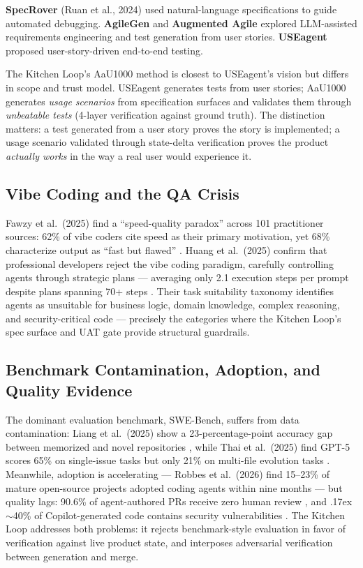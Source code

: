 \documentclass[11pt,a4paper]{article}
\newcommand{\roughly}{{\textraisebox{.17ex}{$\scriptstyle\sim$}}}
\newcommand{\textraisebox}[2]{\leavevmode\raise#1\hbox{#2}}
\begin{document}
\textbf{SpecRover} (Ruan et al., 2024) used natural-language specifications to guide automated debugging. \textbf{AgileGen} and \textbf{Augmented Agile} explored LLM-assisted requirements engineering and test generation from user stories. \textbf{USEagent} proposed user-story-driven end-to-end testing.

The Kitchen Loop's AaU1000 method is closest to USEagent's vision but differs in scope and trust model. USEagent generates tests from user stories; AaU1000 generates \emph{usage scenarios} from specification surfaces and validates them through \emph{unbeatable tests} (4-layer verification against ground truth). The distinction matters: a test generated from a user story proves the story is implemented; a usage scenario validated through state-delta verification proves the product \emph{actually works} in the way a real user would experience it.

\subsection{Vibe Coding and the QA Crisis}\label{sec:vibe-coding-and-the-qa-crisis}

Fawzy et al.~(2025) find a ``speed-quality paradox'' across 101 practitioner sources: 62\% of vibe coders cite speed as their primary motivation, yet 68\% characterize output as ``fast but flawed'' \cite{fawzy2025}. Huang et al.~(2025) confirm that professional developers reject the vibe coding paradigm, carefully controlling agents through strategic plans --- averaging only 2.1 execution steps per prompt despite plans spanning 70+ steps \cite{huang2025}. Their task suitability taxonomy identifies agents as unsuitable for business logic, domain knowledge, complex reasoning, and security-critical code --- precisely the categories where the Kitchen Loop's spec surface and UAT gate provide structural guardrails.

\subsection{Benchmark Contamination, Adoption, and Quality Evidence}\label{sec:benchmark-contamination-adoption-quality}

The dominant evaluation benchmark, SWE-Bench, suffers from data contamination: Liang et al.~(2025) show a 23-percentage-point accuracy gap between memorized and novel repositories \cite{liang2025}, while Thai et al.~(2025) find GPT-5 scores 65\% on single-issue tasks but only 21\% on multi-file evolution tasks \cite{thai2025}. Meanwhile, adoption is accelerating --- Robbes et al.~(2026) find 15--23\% of mature open-source projects adopted coding agents within nine months \cite{robbes2026} --- but quality lags: 90.6\% of agent-authored PRs receive zero human review \cite{rahman2026}, and \roughly40\% of Copilot-generated code contains security vulnerabilities \cite{gao2025}. The Kitchen Loop addresses both problems: it rejects benchmark-style evaluation in favor of verification against live product state, and interposes adversarial verification between generation and merge.
\end{document}
